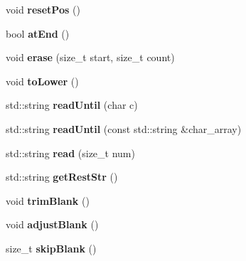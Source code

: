 \begin{DoxyCompactItemize}
\item 
\hypertarget{class_string_buf_a348dbf51944566b92aa19d451a5bc2ac}{
void {\bfseries resetPos} ()}
\label{class_string_buf_a348dbf51944566b92aa19d451a5bc2ac}

\item 
\hypertarget{class_string_buf_abae9727980fea78d8877f3e5b4a920a1}{
bool {\bfseries atEnd} ()}
\label{class_string_buf_abae9727980fea78d8877f3e5b4a920a1}

\item 
\hypertarget{class_string_buf_a72881d314166d56ce8fb1b5a1d487fd6}{
void {\bfseries erase} (size\_\-t start, size\_\-t count)}
\label{class_string_buf_a72881d314166d56ce8fb1b5a1d487fd6}

\item 
\hypertarget{class_string_buf_aea2341194950e5b409bcd5deb08a5b87}{
void {\bfseries toLower} ()}
\label{class_string_buf_aea2341194950e5b409bcd5deb08a5b87}

\item 
\hypertarget{class_string_buf_af91e204e3b4cb57ac00f796804420f76}{
std::string {\bfseries readUntil} (char c)}
\label{class_string_buf_af91e204e3b4cb57ac00f796804420f76}

\item 
\hypertarget{class_string_buf_a3a9f4e2994f859506931771d7d05442f}{
std::string {\bfseries readUntil} (const std::string \&char\_\-array)}
\label{class_string_buf_a3a9f4e2994f859506931771d7d05442f}

\item 
\hypertarget{class_string_buf_a77296c99fcbecb824f48a6268a95d7ca}{
std::string {\bfseries read} (size\_\-t num)}
\label{class_string_buf_a77296c99fcbecb824f48a6268a95d7ca}

\item 
\hypertarget{class_string_buf_afc1208230d05f5071b6099afe5109395}{
std::string {\bfseries getRestStr} ()}
\label{class_string_buf_afc1208230d05f5071b6099afe5109395}

\item 
\hypertarget{class_string_buf_a85f33970f704606f3de9b6794b189a98}{
void {\bfseries trimBlank} ()}
\label{class_string_buf_a85f33970f704606f3de9b6794b189a98}

\item 
\hypertarget{class_string_buf_a743fcefad440a496fb21684e9b7a5dfb}{
void {\bfseries adjustBlank} ()}
\label{class_string_buf_a743fcefad440a496fb21684e9b7a5dfb}

\item 
\hypertarget{class_string_buf_aef6115295836ef02a4c1bbad4ebaaf81}{
size\_\-t {\bfseries skipBlank} ()}
\label{class_string_buf_aef6115295836ef02a4c1bbad4ebaaf81}


\end{DoxyCompactItemize}
